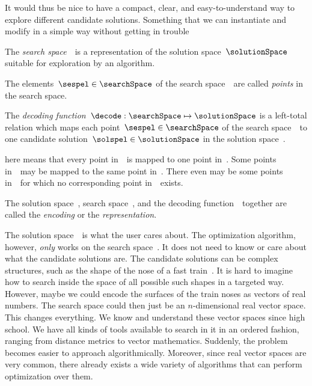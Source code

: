It would thus be nice to have a compact, clear, and easy-to-understand way to explore different candidate solutions.
Something that we can instantiate and modify in a simple way without getting in trouble%
%
%
%
\begin{definition}%
\label{def:searchSpace}%
The \emph{search space}~\searchSpace\ is a representation of the solution space~$\solutionSpace$ suitable for exploration by an algorithm.%
\end{definition}%
%
\begin{definition}%
\label{def:searchSpacePoint}%
The elements~$\sespel\in\searchSpace$ of the search space~\searchSpace\ are called \emph{points} in the search space.%
\end{definition}%
%
\begin{definition}%
\label{def:decoding}%
The \emph{decoding function}~$\decode:\searchSpace\mapsto\solutionSpace$ is a left-total relation which maps each point~$\sespel\in\searchSpace$ of the search space~\searchSpace\ to one candidate solution~$\solspel\in\solutionSpace$ in the solution space~\solutionSpace.%
\end{definition}%
%
 here means that every point in~\searchSpace\ is mapped to one point in~\solutionSpace.
Some points in~\searchSpace\ may be mapped to the same point in~\solutionSpace.
There even may be some points in~\solutionSpace\ for which no corresponding point in~\searchSpace\ exists.%
%
\begin{definition}%
\label{def:encoding}%
The solution space~\solutionSpace, search space~\searchSpace, and the decoding function~\decode\ together are called the \emph{encoding} or the \emph{representation}.%
\end{definition}%
%
The solution space~\solutionSpace\ is what the user cares about.
The optimization algorithm, however, \emph{only} works on the search space~\searchSpace.
It does not need to know or care about what the candidate solutions are.
The candidate solutions can be complex structures, such as the shape of the nose of a fast train~\cite{IMNFM1997ENSFRTSB,KIF2011OOTNSFRMPWRFTE}.
It is hard to imagine how to search inside the space of all possible such shapes in a targeted way.
However, maybe we could encode the surfaces of the train noses as vectors of real numbers.
The search space could then just be an $n$\nobreakdash-dimensional real vector space.
This changes everything.
We know and understand these vector spaces since high school.
We have all kinds of tools available to search in it in an ordered fashion, ranging from distance metrics to vector mathematics.
Suddenly, the problem becomes easier to approach algorithmically.
Moreover, since real vector spaces are very common, there already exists a wide variety of algorithms that can perform optimization over them.

